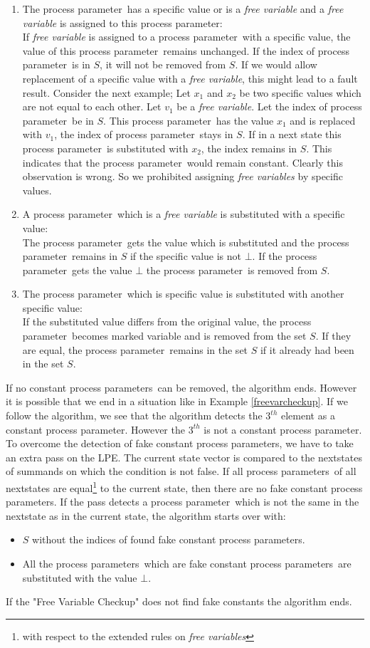 \index{}\documentclass[a4paper,10pt]{article}
\theoremstyle{plain}
\theoremstyle{definition}
\newcommand{\pp}{process parameter}
\newcommand{\pps}{process parameters}
\newcommand{\ti}{\textit}
\begin{document}
\begin{enumerate}
\item The \pp\ has a specific value or is a \ti{free variable} and a \ti{free variable} is assigned to this \pp :\\
If \ti{free variable} is assigned to a \pp\ with a specific value, the value of this \pp\ remains unchanged. If the index of \pp\ is in $S$, it will not be removed from $S$. If we would allow replacement of a specific value with a \ti{free variable}, this might lead to a fault result. Consider the next example; Let $x_1$ and $x_2$ be two specific values which are not equal to each other. Let $v_1$ be a \ti{free variable}. Let the index of \pp\ be in $S$. This \pp\ has the value $x_1$ and is replaced with $v_1$, the index of \pp\ stays in $S$. If in a next state this \pp\ is substituted with $x_2$, the index remains in $S$. This indicates that the \pp\ would remain constant. Clearly this observation is wrong. So we prohibited assigning \ti{free variables} by specific values.

\item A \pp\ which is a \ti{free variable} is substituted with a specific value:\\
The \pp\ gets the value which is substituted and the \pp\ remains in $S$ if the specific value is not $\bot$. If the \pp\ gets the value $\bot$ the \pp\ is removed from $S$.

\item The \pp\ which is specific value is substituted with another specific value:\\
If the substituted value differs from the original value, the \pp\ becomes marked variable and is removed from the set $S$.
If they are equal, the \pp\ remains in the set $S$ if it already had been in the set $S$.
\end{enumerate}

If no constant \pps\ can be removed, the algorithm ends. However it is possible that we end in a situation like in Example \ref{freevarcheckup}. If we follow the algorithm, we see that the algorithm detects the $3^{th}$ element as a constant \pp. However the $3^{th}$ is not a constant \pp . To overcome the detection of fake constant \pps , we have to take an extra pass on the LPE. The current state vector is compared to the nextstates of summands on which the condition is not false.
If all \pps\ of all nextstates are equal\footnote{with respect to the extended rules on \ti{free variables}} to the current state, then there are no fake constant \pps . If the pass detects a \pp\ which is not the same in the nextstate as in the current state, the algorithm starts over with:
\begin{itemize}
\item $S$ without the indices of found fake constant \pps .
\item All the \pps\ which are fake constant \pps\ are substituted with the value $\bot$. 
\end{itemize}
If the "Free Variable Checkup" does not find fake constants the algorithm ends.
\end{document}
